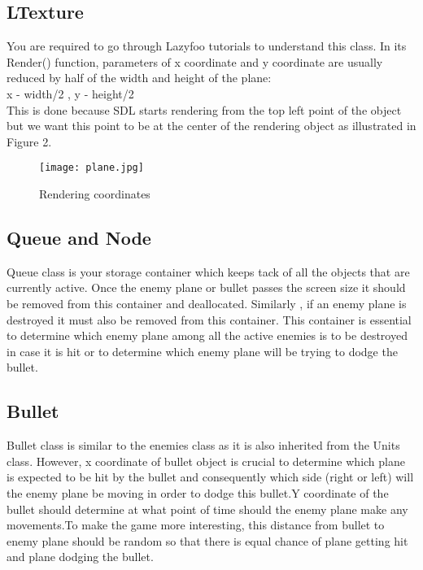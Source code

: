 \documentclass[11pt,fleqn]{book} %
\begin{document}
\subsection{LTexture}
You are required to go through Lazyfoo tutorials to understand this class.
In its Render() function, parameters of x coordinate and y coordinate are usually reduced by half of the width and height of the plane:\\

x - width/2 , y - height/2\\
\hfill \break
This is done because SDL starts rendering from the top left point of the object but we want this point to be at the center of the rendering object as illustrated in Figure 2.

\begin{figure}[h]
  \centering\texttt{[image: plane.jpg]}
  \caption{Rendering coordinates}
\end{figure}

\subsection{Queue and Node}
Queue class is your storage container which keeps tack of all the objects that are currently active. Once the enemy plane or bullet passes the screen size it should be removed from this container and deallocated. Similarly , if an enemy plane is destroyed it must also be removed from this container. This container is essential to determine which enemy plane among all the active enemies is to be destroyed in case it is hit or to determine which enemy plane will be trying to dodge the bullet. 

\subsection{Bullet}
Bullet class is similar to the enemies class as it is also inherited from the Units class. However, x coordinate of bullet object is crucial to determine which plane is expected to be hit by the bullet and consequently which side (right or left) will the enemy plane be moving in order to dodge this bullet.Y coordinate of the bullet should determine at what point of time should the enemy plane make any movements.To make the game more interesting, this distance from bullet to enemy plane should be random so that there is equal chance of plane getting hit and plane dodging the bullet.
\end{document}
